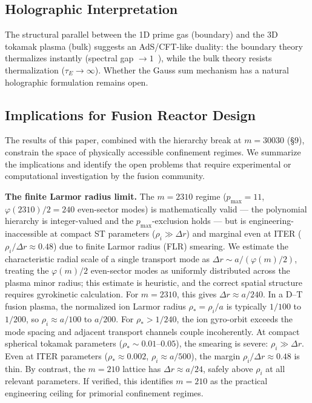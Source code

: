 \documentclass[11pt,letterpaper]{article}
\theoremstyle{definition}
\begin{document}
\subsection{Holographic Interpretation}

The structural parallel between the 1D prime gas (boundary) and the 3D tokamak plasma (bulk) suggests an AdS/CFT-like duality: the boundary theory thermalizes instantly (spectral gap $\to 1$~\cite{matos2026spectral}), while the bulk theory resists thermalization ($\tau_E \to \infty$). Whether the Gauss sum mechanism has a natural holographic formulation remains open.

\subsection{Implications for Fusion Reactor Design}

The results of this paper, combined with the hierarchy break at $m = 30030$ (\S9), constrain the space of physically accessible confinement regimes. We summarize the implications and identify the open problems that require experimental or computational investigation by the fusion community.

\medskip
\textbf{The finite Larmor radius limit.} The $m = 2310$ regime ($p_{\text{max}} = 11$, $\varphi(2310)/2 = 240$ even-sector modes) is mathematically valid --- the polynomial hierarchy is integer-valued and the $p_{\text{max}}$-exclusion holds --- but is engineering-inaccessible at compact ST parameters ($\rho_i \gg \Delta r$) and marginal even at ITER ($\rho_i / \Delta r \approx 0.48$) due to finite Larmor radius (FLR) smearing. We estimate the characteristic radial scale of a single transport mode as $\Delta r \sim a / (\varphi(m)/2)$, treating the $\varphi(m)/2$ even-sector modes as uniformly distributed across the plasma minor radius; this estimate is heuristic, and the correct spatial structure requires gyrokinetic calculation. For $m = 2310$, this gives $\Delta r \approx a/240$. In a D--T fusion plasma, the normalized ion Larmor radius $\rho_* = \rho_i / a$ is typically $1/100$ to $1/200$, so $\rho_i \approx a/100$ to $a/200$. For $\rho_* > 1/240$, the ion gyro-orbit exceeds the mode spacing and adjacent transport channels couple incoherently. At compact spherical tokamak parameters ($\rho_* \sim 0.01$--$0.05$), the smearing is severe: $\rho_i \gg \Delta r$. Even at ITER parameters ($\rho_* \approx 0.002$, $\rho_i \approx a/500$), the margin $\rho_i / \Delta r \approx 0.48$ is thin. By contrast, the $m = 210$ lattice has $\Delta r \approx a/24$, safely above $\rho_i$ at all relevant parameters. If verified, this identifies $m = 210$ as the practical engineering ceiling for primorial confinement regimes.
\end{document}
